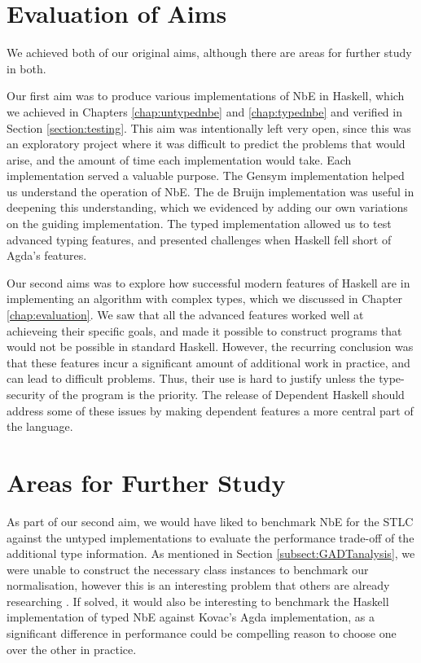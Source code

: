 \section{Evaluation of Aims}

We achieved both of our original aims, although there are areas for further study in both.

Our first aim was to produce various implementations of NbE in Haskell, which we achieved in Chapters \ref{chap:untypednbe} and \ref{chap:typednbe} and verified in Section \ref{section:testing}. This aim was intentionally left very open, since this was an exploratory project where it was difficult to predict the problems that would arise, and the amount of time each implementation would take. Each implementation served a valuable purpose. The Gensym implementation helped us understand the operation of NbE. The de Bruijn implementation was useful in deepening this understanding, which we evidenced by adding our own variations on the guiding implementation. The typed implementation allowed us to test advanced typing features, and presented challenges when Haskell fell short of Agda's features.

Our second aims was to explore how successful modern features of Haskell are in implementing an algorithm with complex types, which we discussed in Chapter \ref{chap:evaluation}. We saw that all the advanced features worked well at achieveing their specific goals, and made it possible to construct programs that would not be possible in standard Haskell. However, the recurring conclusion was that these features incur a significant amount of additional work in practice, and can lead to difficult problems. Thus, their use is hard to justify unless the type-security of the program is the priority. The release of Dependent Haskell \cite{DH} should address some of these issues by making dependent features a more central part of the language.

\section{Areas for Further Study}

As part of our second aim, we would have liked to benchmark NbE for the STLC against the untyped implementations to evaluate the performance trade-off of the additional type information. As mentioned in Section \ref{subsect:GADTanalysis}, we were unable to construct the necessary class instances to benchmark our normalisation, however this is an interesting problem that others are already researching \cite{gadtClassInstances}. If solved, it would also be interesting to benchmark the Haskell implementation of typed NbE against Kovac's Agda implementation, as a significant difference in performance could be compelling reason to choose one over the other in practice.

